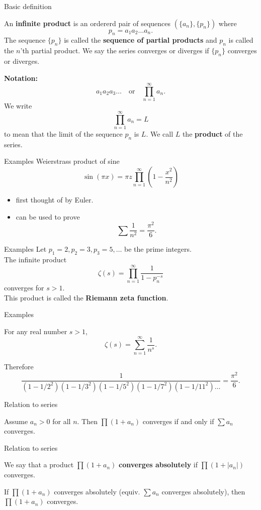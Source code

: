 \documentclass{beamer}
\begin{document}
\begin{frame}{Basic definition}
\begin{defn}
An \textbf{infinite product} is an ordererd pair of sequences $(\{a_n\},\{p_n\})$ where 
$$p_n = a_1a_2\dots a_n.$$
The sequence $\{p_n\}$ is called the \textbf{sequence of partial products} and $p_n$ is called the $n$'th partial product.
We say the series converges or diverges if $\{p_n\}$ converges or diverges.
\end{defn}
\textbf{Notation:}
$$a_1a_2a_3\dots\quad\text{or}\quad \prod_{n=1}^\infty a_n.$$
We write
$$\prod_{n=1}^\infty a_n = L$$
to mean that the limit of the sequence $p_n$ is $L$.
We call $L$ the \textbf{product} of the series.
\end{frame}

\begin{frame}{Examples}
Weierstrass product of sine
$$\sin(\pi x) = \pi z\prod_{n=1}^\infty \left(1-\frac{x^2}{n^2}\right)$$
\begin{itemize}
\item first thought of by Euler.
\item can be used to prove 
$$\sum \frac{1}{n^2} = \frac{\pi^2}{6}.$$
\end{itemize}
\end{frame}

\begin{frame}{Examples}
Let $p_1=2,p_2=3,p_3=5,\dots$ be the prime integers.\\
The infinite product
$$\zeta(s) = \prod_{n=1}^\infty \frac{1}{1-p_n^{-s}}$$
converges for $s>1$.\\
This product is called the \textbf{Riemann zeta function}.
\end{frame}

\begin{frame}{Examples}
\begin{thm}
For any real number $s>1$,
$$\zeta(s) = \sum_{n=1}^\infty \frac{1}{n^s}.$$
\end{thm}
Therefore
$$\frac{1}{(1-1/2^2)(1-1/3^2)(1-1/5^2)(1-1/7^2)(1-1/11^2)\dots} = \frac{\pi^2}{6}.$$
\end{frame}

\begin{frame}{Relation to series}
\begin{thm}
Assume $a_n > 0$ for all $n$.
Then $\prod (1+a_n)$ converges if and only if $\sum a_n$ converges.
\end{thm}
\end{frame}

\begin{frame}{Relation to series}
\begin{defn}
We say that a product $\prod (1+a_n)$ \textbf{converges absolutely} if $\prod (1+|a_n|)$ converges.
\end{defn}
\begin{thm}
If $\prod (1+a_n)$ converges absolutely (equiv. $\sum a_n$ converges absolutely), then $\prod (1+a_n)$ converges.
\end{thm}
\end{frame}
\end{document}
